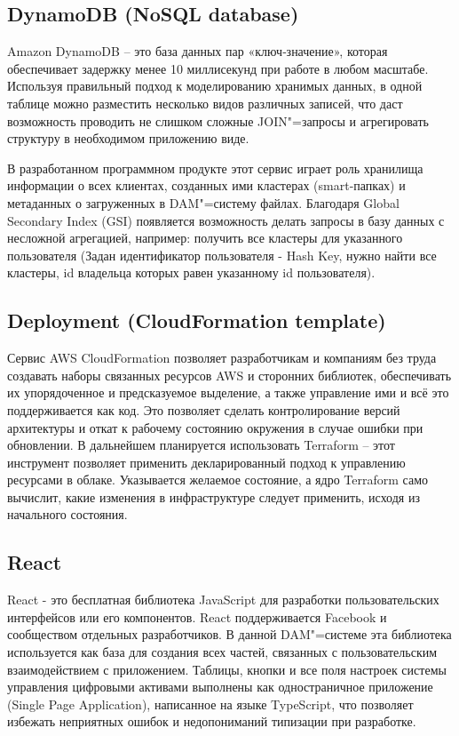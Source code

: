 \subsection{DynamoDB (NoSQL database)}
Amazon DynamoDB – это база данных пар «ключ‑значение», которая обеспечивает задержку менее 10 миллисекунд при работе в любом масштабе. Используя правильный подход к моделированию хранимых данных, в одной таблице можно разместить несколько видов различных записей, что даст возможность проводить не слишком сложные JOIN"=запросы и агрегировать структуру в необходимом приложению виде.

В разработанном программном продукте этот сервис играет роль хранилища информации о всех клиентах, созданных ими кластерах (smart-папках) и метаданных о загруженных в DAM"=систему файлах. Благодаря Global Secondary Index (GSI) появляется возможность делать запросы в базу данных с несложной агрегацией, например: получить все кластеры для указанного пользователя (Задан идентификатор пользователя - Hash Key, нужно найти все кластеры, id владельца которых равен указанному id пользователя).


\subsection{Deployment (CloudFormation template)}
Сервис AWS CloudFormation позволяет разработчикам и компаниям без труда создавать наборы связанных ресурсов AWS и сторонних библиотек, обеспечивать их упорядоченное и предсказуемое выделение, а также управление ими и всё это поддерживается как код. Это позволяет сделать контролирование версий архитектуры и откат к рабочему состоянию окружения в случае ошибки при обновлении. В дальнейшем планируется использовать Terraform – этот инструмент позволяет применить декларированный подход к управлению ресурсами в облаке. Указывается желаемое состояние, а ядро Terraform само вычислит, какие изменения в инфраструктуре следует применить, исходя из начального состояния.

\subsection{React}
React - это бесплатная библиотека JavaScript для разработки пользовательских интерфейсов или его компонентов. React поддерживается Facebook и сообществом отдельных разработчиков. В данной DAM"=системе эта библиотека используется как база для создания всех частей, связанных с пользовательским взаимодействием с приложением. Таблицы, кнопки и все поля настроек системы управления цифровыми активами выполнены как одностраничное приложение (Single Page Application), написанное на языке TypeScript, что позволяет избежать неприятных ошибок и недопониманий типизации при разработке. 

